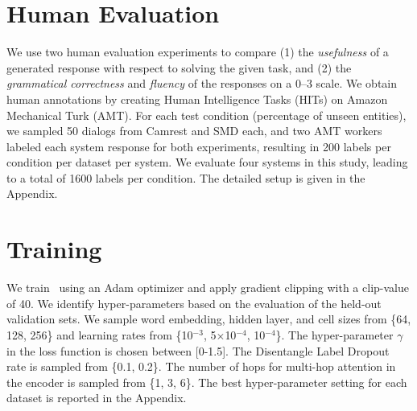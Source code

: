 \section{Human Evaluation}
We use two human evaluation experiments to compare (1) the \emph{usefulness} of a generated response with respect to solving the given task, and (2) the \emph{grammatical correctness} and \emph{fluency} of the responses on a 0--3 scale. We obtain human annotations by creating Human Intelligence Tasks (HITs) on Amazon Mechanical Turk (AMT). For each test condition (percentage of unseen entities), we sampled 50 dialogs from Camrest and SMD each, and two AMT workers labeled each system response for both experiments, resulting in 200 labels per condition per dataset per system. We evaluate four systems in this study, leading to a total of 1600 labels per condition. The detailed setup is given in the Appendix. 

\section{Training}
We train \sys\ using an Adam optimizer \cite{kingma2014adam} and apply gradient clipping with a clip-value of 40. We identify hyper-parameters based on the evaluation of the held-out validation sets. We sample word embedding, hidden layer, and cell sizes from \{64, 128, 256\} and learning rates from \{10$^{-3}$, 5$\times$10$^{-4}$, 10$^{-4}$\}. The hyper-parameter $\gamma$ in the loss function is chosen between [0-1.5]. The Disentangle Label Dropout rate is sampled from \{0.1, 0.2\}. The number of hops for multi-hop attention in the encoder is sampled from \{1, 3, 6\}. The best hyper-parameter setting for each dataset is reported in the Appendix.

